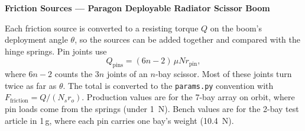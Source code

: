 \documentclass[11pt]{article}
\begin{document}
\begin{center}
{\Large\textbf{Friction Sources --- Paragon Deployable Radiator Scissor Boom}}
\end{center}

Each friction source is converted to a resisting torque $Q$ on the boom's deployment angle $\theta$, so the
sources can be added together and compared with the hinge springs. Pin joints use
\begin{equation*}
Q_{\text{pins}} = (6n-2)\,\mu N r_{\text{pin}},
\end{equation*}
where $6n-2$ counts the $3n$ joints of an $n$-bay scissor. Most of these joints turn twice as far as
$\theta$. The total is converted to the \texttt{params.py} convention with
$F_{\text{friction}} = Q/(N_s r_o)$. Production values are for the 7-bay array on orbit, where pin loads
come from the springs (under \SI{1}{N}). Bench values are for the 2-bay test article in 1\,g, where each
pin carries one bay's weight (\SI{10.4}{N}).
\end{document}
